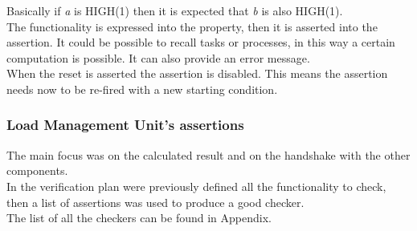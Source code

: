 Basically if \emph{a} is HIGH(1) then it is expected that \emph{b} is also HIGH(1).\\

The functionality is expressed into the property, then it is asserted into the assertion. It could be possible to recall tasks or processes, in this way a certain computation is possible.
It can also provide an error message.\\
When the reset is asserted the assertion is disabled. This means the assertion needs now to be re-fired with a new starting condition.\\

\subsubsection{Load Management Unit's assertions}
The main focus was on the calculated result and on the handshake with the other components.\\

In the verification plan were previously defined all the functionality to check, then a list of assertions was used to produce a good checker.\\

The list of all the checkers can be found in Appendix.\\

